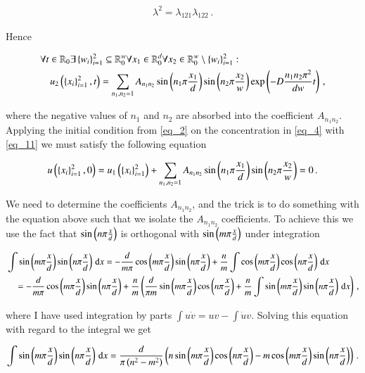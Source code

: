 \documentclass[11pt,english,a4paper]{article}
\begin{document}
\begin{flushleft}
\begin{align*}
\lambda^2 = \lambda_{121}\lambda_{122}\,.
\end{align*}

Hence

\begin{align}
&\forall t\in \mathbb{R}_0\exists\left\lbrace{w_i}\right\rbrace_{i=1}^2\subseteq \mathbb{R}_0^w \forall x_1\in \mathbb{R}_{0}^d \forall x_2\in\mathbb{R}_0^w \setminus \left\lbrace{w_i}\right\rbrace_{i=1}^2 : 
\nonumber\\
&\quad u_2\left({\left\lbrace{x_i}\right\rbrace_{i=1}^2,t}\right) = \sum_{n_1,n_2=1} A_{n_1 n_2} \sin\left({n_1\pi \frac{x_1}{d}}\right) \sin\left({n_2\pi \frac{x_2}{w}}\right) \exp\left({-D\frac{n_1 n_2 \pi^2}{dw} t}\right)\,,
\label{eq_11}
\end{align}

where the negative values of $n_1$ and $n_2$ are absorbed into the coefficient $A_{n_1 n_2}$. Applying the initial condition from \eqref{eq_2} on the concentration in \eqref{eq_4} with \eqref{eq_11} we must satisfy the following equation

\begin{align}
u\left({\left\lbrace{x_i}\right\rbrace_{i=1}^2,0}\right) = u_1\left({\left\lbrace{x_i}\right\rbrace_{i=1}^2}\right)+ \sum_{n_1,n_2=1} A_{n_1 n_2} \sin\left({n_1\pi \frac{x_1}{d}}\right) \sin\left({n_2\pi \frac{x_2}{w}}\right)= 0 \,.
\label{eq_12}
\end{align}

We need to determine the coefficients $A_{n_1 n_2}$, and the trick is to do something with the equation above such that we isolate the $A_{n_1 n_2}$ coefficients. To achieve this we use the fact that $\sin\left({n\pi\frac{x}{d}}\right)$ is orthogonal with $\sin\left({m\pi\frac{x}{d}}\right)$ under integration 

\begin{align*}
&\int \sin\left({m\pi\frac{x}{d}}\right)\sin\left({n\pi\frac{x}{d}}\right)\,\mathrm{d}x = -\frac{d}{m\pi}\cos\left({m\pi\frac{x}{d}}\right)\sin\left({n\pi\frac{x}{d}}\right) + \frac{n}{m}\int \cos\left({m\pi\frac{x}{d}}\right)\cos\left({n\pi\frac{x}{d}}\right)\,\mathrm{d}x
\\
&\quad = -\frac{d}{m\pi}\cos\left({m\pi\frac{x}{d}}\right)\sin\left({n\pi\frac{x}{d}}\right) + \frac{n}{m}\left({\frac{d}{\pi m} \sin\left({m\pi\frac{x}{d}}\right) \cos\left({n\pi\frac{x}{d}}\right) + \frac{n}{m}\int \sin\left({m\pi\frac{x}{d}}\right)\sin\left({n\pi\frac{x}{d}}\right)\,\mathrm{d}x}\right) \,,
\end{align*}

where I have used integration by parts $\int u\dot{v} = uv - \int \dot{u}v$. Solving this equation with regard to the integral we get

\begin{align*}
\int \sin\left({m\pi\frac{x}{d}}\right)\sin\left({n\pi\frac{x}{d}}\right)\,\mathrm{d}x = \frac{d}{\pi\left({n^2 - m^2}\right)} \left({n \sin\left({m\pi\frac{x}{d}}\right)\cos\left({n\pi\frac{x}{d}}\right) - m \cos\left({m\pi\frac{x}{d}}\right)\sin\left({n\pi\frac{x}{d}}\right)}\right) \,.
\end{align*}


\end{flushleft}
\end{document}
